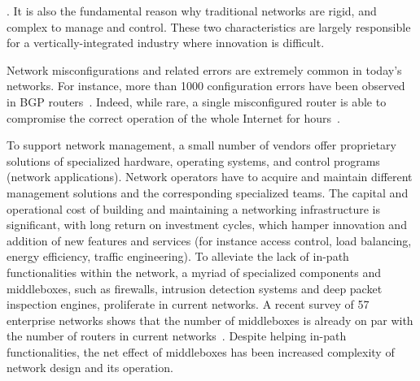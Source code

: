 . %
It is also the 
fundamental reason why traditional networks are rigid, and complex to manage and control.
These two characteristics are largely responsible for a vertically-integrated industry where 
innovation is difficult.

Network misconfigurations and related errors are extremely common in today's networks. 
For instance, more than 1000 configuration errors have been observed in BGP 
routers~\cite{feamster2005}. 
Indeed, while rare, a single misconfigured router is able to compromise the correct operation of the 
whole Internet for hours~\cite{barrett1997,butler2010}. 

To support network management, a small number of vendors offer proprietary solutions of 
specialized hardware, operating systems, and control programs (network applications). 
Network operators have to acquire and maintain different management solutions and the 
corresponding specialized teams.  The capital and operational cost of building and 
maintaining a networking infrastructure is significant, with long return on investment 
cycles, which hamper innovation and addition of new features and services (for instance 
access control, load balancing, energy efficiency, traffic engineering).  
To alleviate the lack of in-path functionalities within the network, a myriad of specialized 
components and middleboxes, such as firewalls, intrusion detection systems and deep packet inspection engines, proliferate 
in current networks. A recent survey of 57 enterprise networks shows that the number of 
middleboxes is already on par with the number of routers in current networks~\cite{sherry2012}.
Despite helping in-path functionalities, the net effect of middleboxes has been increased
complexity of network design and its operation.

